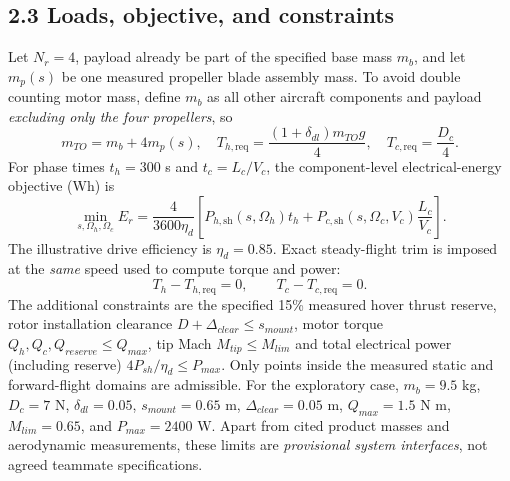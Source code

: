 \documentclass[12pt]{article}
\begin{document}
\subsection*{2.3 Loads, objective, and constraints}
Let $N_r=4$, payload already be part of the specified base mass $m_b$, and let $m_p(s)$ be one measured propeller blade assembly mass. To avoid double counting motor mass, define $m_b$ as all other aircraft components and payload \emph{excluding only the four propellers}, so
\begin{equation}
m_{TO}=m_b+4m_p(s),\quad
T_{h,\mathrm{req}}=\frac{(1+\delta_{dl})m_{TO}g}{4},\quad
T_{c,\mathrm{req}}=\frac{D_c}{4}.
\label{eq:requirements}
\end{equation}
For phase times $t_h=300$ s and $t_c=L_c/V_c$, the component-level electrical-energy objective (Wh) is
\begin{equation}
\min_{s,\Omega_h,\Omega_c} E_r =
\frac{4}{3600\eta_d}\left[P_{h,\mathrm{sh}}(s,\Omega_h)t_h
+P_{c,\mathrm{sh}}(s,\Omega_c,V_c)\frac{L_c}{V_c}\right].
\label{eq:objective}
\end{equation}
The illustrative drive efficiency is $\eta_d=0.85$. Exact steady-flight trim is imposed at the \emph{same} speed used to compute torque and power:
\begin{equation}
T_h-T_{h,\mathrm{req}}=0,\qquad T_c-T_{c,\mathrm{req}}=0.
\end{equation}
The additional constraints are the specified 15\% measured hover thrust reserve, rotor installation clearance $D+\Delta_{clear}\le s_{mount}$, motor torque $Q_h,Q_c,Q_{reserve}\le Q_{max}$, tip Mach $M_{tip}\le M_{lim}$ and total electrical power (including reserve) $4P_{sh}/\eta_d\le P_{max}$. Only points inside the measured static and forward-flight domains are admissible. For the exploratory case, $m_b=9.5$ kg, $D_c=7$ N, $\delta_{dl}=0.05$, $s_{mount}=0.65$ m, $\Delta_{clear}=0.05$ m, $Q_{max}=1.5$ N m, $M_{lim}=0.65$, and $P_{max}=2400$ W. Apart from cited product masses and aerodynamic measurements, these limits are \emph{provisional system interfaces}, not agreed teammate specifications.
\end{document}
